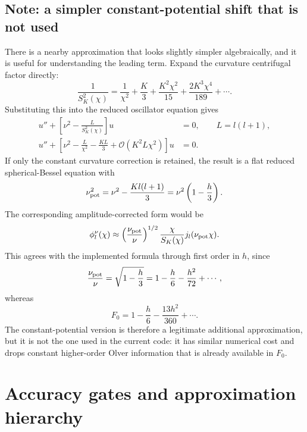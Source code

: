 \documentclass[11pt,a4paper]{article}
\newcommand{\SK}{S_K}
\newcommand{\order}{\mathcal{O}}
\begin{document}
\subsection*{Note: a simpler constant-potential shift that is not used}

There is a nearby approximation that looks slightly simpler algebraically, and
it is useful for understanding the leading term.  Expand the curvature
centrifugal factor directly:
\begin{equation}
  \frac{1}{\SK^2(\chi)}
  =\frac{1}{\chi^2}+\frac{K}{3}+\frac{K^2\chi^2}{15}
  +\frac{2K^3\chi^4}{189}+\cdots.
  \label{eq:SK-inverse-expansion}
\end{equation}
Substituting this into the reduced oscillator equation gives
\begin{align}
  u''+\left[\nu^2-\frac{L}{\SK^2(\chi)}\right]u&=0,
  \qquad L=l(l+1),\\
  u''+\left[\nu^2-\frac{L}{\chi^2}-\frac{KL}{3}
  +\order(K^2L\chi^2)\right]u&=0.
\end{align}
If only the constant curvature correction is retained, the result is a flat
reduced spherical-Bessel equation with
\begin{equation}
  \nu_{\rm pot}^2=\nu^2-\frac{K l(l+1)}{3}
  =\nu^2\left(1-\frac{h}{3}\right).
  \label{eq:nueff-constant-potential}
\end{equation}
The corresponding amplitude-corrected form would be
\begin{equation}
  \phi_l^\nu(\chi)\approx
  \left(\frac{\nu_{\rm pot}}{\nu}\right)^{1/2}
  \frac{\chi}{\SK(\chi)}j_l(\nu_{\rm pot}\chi).
  \label{eq:constant-potential-shift}
\end{equation}
This agrees with the implemented formula through first order in \(h\), since
\begin{equation}
  \frac{\nu_{\rm pot}}{\nu}
  =\sqrt{1-\frac{h}{3}}
  =1-\frac{h}{6}-\frac{h^2}{72}+\cdots,
\end{equation}
whereas
\begin{equation}
  F_0=1-\frac{h}{6}-\frac{13h^2}{360}+\cdots.
\end{equation}
The constant-potential version is therefore a legitimate additional
approximation, but it is not the one used in the current code: it has similar
numerical cost and drops constant higher-order Olver information that is already
available in \(F_0\).

\section{Accuracy gates and approximation hierarchy}
\end{document}
